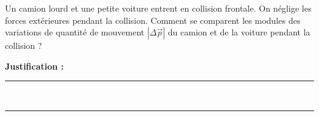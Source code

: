 Un camion lourd et une petite voiture entrent en collision frontale. On néglige les forces extérieures pendant la collision. Comment se comparent les modules des variations de quantité de mouvement $|\Delta\vec p|$ du camion et de la voiture pendant la collision ?

\choices

\noindent\textbf{Justification :} \hrulefill \\[2.5ex]
\rule{\linewidth}{0.4pt} \\[2.5ex]
\rule{\linewidth}{0.4pt}
\vfill

